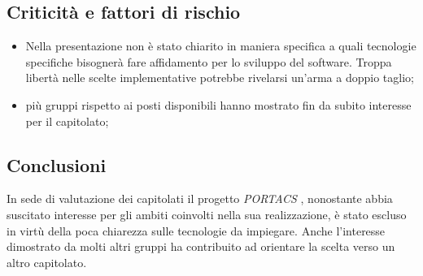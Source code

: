 \subsection{Criticità e fattori di rischio}
\begin{itemize}
    \item Nella presentazione non è stato chiarito in maniera specifica a quali tecnologie specifiche bisognerà fare affidamento per lo sviluppo del software. Troppa libertà nelle scelte implementative potrebbe rivelarsi un’arma a doppio taglio;
    \item più gruppi rispetto ai posti disponibili hanno mostrato fin da subito interesse per il capitolato;
\end{itemize}

\subsection{Conclusioni}
In sede di valutazione dei capitolati il progetto \textit{PORTACS} , nonostante abbia suscitato interesse per gli ambiti coinvolti nella sua realizzazione, è stato escluso in virtù della poca chiarezza sulle tecnologie da impiegare. Anche l’interesse dimostrato da molti altri gruppi ha contribuito ad orientare la scelta verso un altro capitolato.


